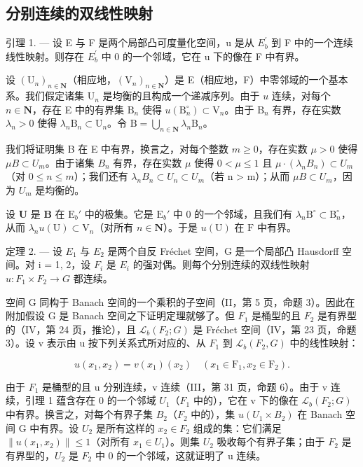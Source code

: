 \subsection{分别连续的双线性映射}

引理 1. --- 设 E 与 F 是两个局部凸可度量化空间，u 是从 \(E_{b}^{\prime}\) 到 F 中的一个连续线性映射。则存在 \(E_{b}^{\prime}\) 中 0 的一个邻域，它在 u 下的像在 F 中有界。

设 \((\mathrm{U}_n)_{n\in \mathbf{N}}\)（相应地，\((\mathrm{V}_n)_{n\in \mathbf{N}}\)）是 E（相应地，F）中零邻域的一个基本系。我们假定诸集 \(\mathrm{U}_n\) 是均衡的且构成一个递减序列。由于 \(u\) 连续，对每个 \(n\in \mathbf{N}\)，存在 E 中的有界集 \(\mathrm{B}_n\) 使得 \(u(\mathrm{B}_n^\circ)\subset \mathrm{V}_n\)。由于 \(\mathrm{B}_n\) 有界，存在实数 \(\lambda_n > 0\) 使得 \(\lambda_{n}\mathrm{B}_{n}\subset \mathrm{U}_{n}\)。令 \(\mathrm{B} = \bigcup_{n\in \mathbf{N}}\lambda_n\mathrm{B}_n\)。

我们将证明集 B 在 E 中有界，换言之，对每个整数 \(m \geqslant 0\)，存在实数 \(\mu > 0\) 使得 \(\mu B \subset U_{m}\)。由于诸集 \(B_{n}\) 有界，存在实数 \(\mu\) 使得 \(0 < \mu \leqslant 1\) 且 \(\mu \cdot (\lambda_{n} B_{n}) \subset U_{m}\)（对 \(0 \leqslant n \leqslant m\)）；我们还有 \(\lambda_{n} B_{n} \subset U_{n} \subset U_{m}\)（若 n \textgreater{} m）；从而 \(\mu B \subset U_{m}\)，因为 \(U_{m}\) 是均衡的。

设 \(\mathbf{U}\) 是 \(\mathbf{B}\) 在 \(\mathrm{E}_b'\) 中的极集。它是 \(\mathrm{E}_b'\) 中 0 的一个邻域，且我们有 \(\lambda_n\mathrm{B}^\circ \subset \mathrm{B}_n^\circ\)，从而 \(\lambda_n u(\mathrm{U}) \subset \mathrm{V}_n\)（对所有 \(n \in \mathbf{N}\)）。于是 \(u(\mathrm{U})\) 在 \(\mathrm{F}\) 中有界。

定理 2. --- 设 \(E_{1}\) 与 \(E_{2}\) 是两个自反 Fréchet 空间，G 是一个局部凸 Hausdorff 空间。对 i = 1, 2，设 \(F_{i}\) 是 \(E_{i}\) 的强对偶。则每个分别连续的双线性映射 \(u: F_{1} \times F_{2} \to G\) 都连续。

空间 G 同构于 Banach 空间的一个乘积的子空间（II，第 5 页，命题 3）。因此在附加假设 G 是 Banach 空间之下证明定理就够了。但 \(F_{1}\) 是桶型的且 \(F_{2}\) 是有界型的（IV，第 24 页，推论），且 \(\mathcal{L}_{b}(F_{2}; G)\) 是 Fréchet 空间（IV，第 23 页，命题 3）。设 v 表示由 u 按下列关系式所对应的、从 \(F_{1}\) 到 \(\mathcal{L}_{b}(F_{2}, G)\) 中的线性映射：

\[
u (x _ {1}, x _ {2}) = v (x _ {1}) \left(x _ {2}\right) \quad \left(x _ {1} \in \mathrm{F} _ {1}, x _ {2} \in \mathrm{F} _ {2}\right).
\]

由于 \(F_{1}\) 是桶型的且 u 分别连续，v 连续（III，第 31 页，命题 6）。由于 v 连续，引理 1 蕴含存在 0 的一个邻域 \(U_{1}\)（\(F_{1}\) 中的），它在 v 下的像在 \(\mathcal{L}_{b}(F_{2}; G)\) 中有界。换言之，对每个有界子集 \(B_{2}\)（\(F_{2}\) 中的），集 \(u(U_{1} \times B_{2})\) 在 Banach 空间 G 中有界。设 \(U_{2}\) 是所有这样的 \(x_{2} \in F_{2}\) 组成的集：它们满足 \(\|u(x_{1}, x_{2})\| \leqslant 1\)（对所有 \(x_{1} \in U_{1}\)）。则集 \(U_{2}\) 吸收每个有界子集；由于 \(F_{2}\) 是有界型的，\(U_{2}\) 是 \(F_{2}\) 中 0 的一个邻域，这就证明了 u 连续。

